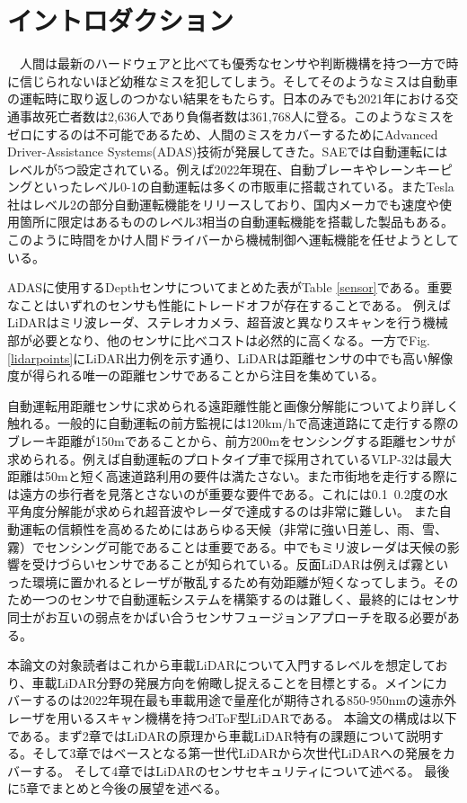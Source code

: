 \documentclass[twocolumn, 11pt, a4j]{article}
\begin{document}
\section{イントロダクション}
　人間は最新のハードウェアと比べても優秀なセンサや判断機構を持つ一方で時に信じられないほど幼稚なミスを犯してしまう。そしてそのようなミスは自動車の運転時に取り返しのつかない結果をもたらす。日本のみでも2021年における交通事故死亡者数は2,636人であり負傷者数は361,768人に登る\cite{keisatsu}。このようなミスをゼロにするのは不可能であるため、人間のミスをカバーするためにAdvanced Driver-Assistance Systems(ADAS)技術が発展してきた。SAEでは自動運転にはレベルが5つ設定されている\cite{sae}。例えば2022年現在、自動ブレーキやレーンキーピングといったレベル0-1の自動運転は多くの市販車に搭載されている。またTesla社はレベル2の部分自動運転機能をリリースしており、国内メーカでも速度や使用箇所に限定はあるもののレベル3相当の自動運転機能を搭載した製品もある。このように時間をかけ人間ドライバーから機械制御へ運転機能を任せようとしている。

ADASに使用するDepthセンサについてまとめた表がTable \ref{sensor}である。重要なことはいずれのセンサも性能にトレードオフが存在することである。
例えばLiDARはミリ波レーダ、ステレオカメラ、超音波と異なりスキャンを行う機械部が必要となり、他のセンサに比べコストは必然的に高くなる。一方でFig.\ref{lidarpoints}にLiDAR出力例を示す通り、LiDARは距離センサの中でも高い解像度が得られる唯一の距離センサであることから注目を集めている。

自動運転用距離センサに求められる遠距離性能と画像分解能についてより詳しく触れる。一般的に自動運転の前方監視には120km/hで高速道路にて走行する際のブレーキ距離が150mであることから、前方200mをセンシングする距離センサが求められる。例えば自動運転のプロトタイプ車で採用されているVLP-32\cite{velodyne, velopatent}は最大距離は50mと短く高速道路利用の要件は満たさない。また市街地を走行する際には遠方の歩行者を見落とさないのが重要な要件である。これには0.1~0.2度の水平角度分解能が求められ超音波やレーダ\cite{mitomo201077}で達成するのは非常に難しい。
また自動運転の信頼性を高めるためにはあらゆる天候（非常に強い日差し、雨、雪、霧）でセンシング可能であることは重要である。中でもミリ波レーダは天候の影響を受けづらいセンサであることが知られている。反面LiDARは例えば霧といった環境に置かれるとレーザが散乱するため有効距離が短くなってしまう。そのため一つのセンサで自動運転システムを構築するのは難しく、最終的にはセンサ同士がお互いの弱点をかばい合うセンサフュージョンアプローチを取る必要がある。

本論文の対象読者はこれから車載LiDARについて入門するレベルを想定しており、車載LiDAR分野の発展方向を俯瞰し捉えることを目標とする。メインにカバーするのは2022年現在最も車載用途で量産化が期待される850-950nmの遠赤外レーザを用いるスキャン機構を持つdToF型LiDARである\cite{niclass2012100, yoshioka201820, kondo2020automotive, ta20202d, kumagai2021189x600}。
本論文の構成は以下である。まず2章ではLiDARの原理から車載LiDAR特有の課題について説明する。そして3章ではベースとなる第一世代LiDARから次世代LiDARへの発展をカバーする。
そして4章ではLiDARのセンサセキュリティについて述べる。
最後に5章でまとめと今後の展望を述べる。
\end{document}
